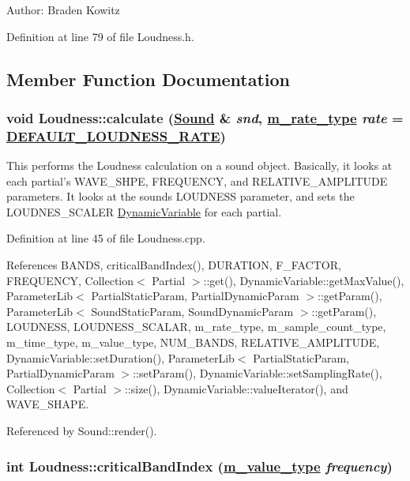 \begin{enumerate}
\begin{itemize}
\begin{Desc}
\item[Author:]Braden Kowitz \end{Desc}
\end{itemize}
\end{enumerate}




Definition at line 79 of file Loudness.h.

\subsection{Member Function Documentation}
\hypertarget{classLoudness_e0}{
\subsubsection[calculate]{\setlength{\rightskip}{0pt plus 5cm}void Loudness::calculate (\hyperlink{classSound}{Sound} \& {\em snd}, \hyperlink{Types_8h_a4}{m\_\-rate\_\-type} {\em rate} = \hyperlink{Types_8h_a6}{DEFAULT\_\-LOUDNESS\_\-RATE})}}
\label{classLoudness_e0}


This performs the Loudness calculation on a sound object. Basically, it looks at each partial's WAVE\_\-SHPE, FREQUENCY, and RELATIVE\_\-AMPLITUDE parameters. It looks at the sounds LOUDNESS parameter, and sets the LOUDNES\_\-SCALER \hyperlink{classDynamicVariable}{Dynamic\-Variable} for each partial. 

Definition at line 45 of file Loudness.cpp.

References BANDS, critical\-Band\-Index(), DURATION, F\_\-FACTOR, FREQUENCY, Collection$<$ Partial $>$::get(), Dynamic\-Variable::get\-Max\-Value(), Parameter\-Lib$<$ Partial\-Static\-Param, Partial\-Dynamic\-Param $>$::get\-Param(), Parameter\-Lib$<$ Sound\-Static\-Param, Sound\-Dynamic\-Param $>$::get\-Param(), LOUDNESS, LOUDNESS\_\-SCALAR, m\_\-rate\_\-type, m\_\-sample\_\-count\_\-type, m\_\-time\_\-type, m\_\-value\_\-type, NUM\_\-BANDS, RELATIVE\_\-AMPLITUDE, Dynamic\-Variable::set\-Duration(), Parameter\-Lib$<$ Partial\-Static\-Param, Partial\-Dynamic\-Param $>$::set\-Param(), Dynamic\-Variable::set\-Sampling\-Rate(), Collection$<$ Partial $>$::size(), Dynamic\-Variable::value\-Iterator(), and WAVE\_\-SHAPE.

Referenced by Sound::render().\hypertarget{classLoudness_h0}{
\subsubsection[criticalBandIndex]{\setlength{\rightskip}{0pt plus 5cm}int Loudness::critical\-Band\-Index (\hyperlink{Types_8h_a3}{m\_\-value\_\-type} {\em frequency})}}
\label{classLoudness_h0}


